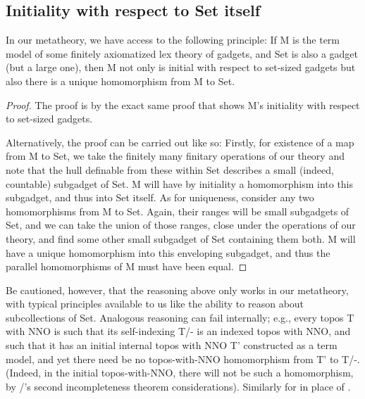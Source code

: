 \subsection{Initiality with respect to Set itself}
\begin{observation}\label{InitialWrtSet}
In our metatheory, we have access to the following principle: If M is the term model of some finitely axiomatized lex theory of gadgets, and Set is also a gadget (but a large one), then M not only is initial with respect to set-sized gadgets but also there is a unique homomorphism from M to Set.
\end{observation}
\begin{proof}
The proof is by the exact same proof that shows M's initiality with respect to set-sized gadgets.

Alternatively, the proof can be carried out like so: Firstly, for existence of a map from M to Set, we take the finitely many finitary operations of our theory and note that the hull definable from these within Set describes a small (indeed, countable) subgadget of Set. M will have by initiality a homomorphism into this subgadget, and thus into Set itself. As for uniqueness, consider any two homomorphisms from M to Set. Again, their ranges will be small subgadgets of Set, and we can take the union of those ranges, close under the operations of our theory, and find some other small subgadget of Set containing them both. M will have a unique homomorphism into this enveloping subgadget, and thus the parallel homomorphisms of M must have been equal.
\end{proof}

Be cautioned, however, that the reasoning above only works in our metatheory, with typical principles available to us like the ability to reason about subcollections of Set. Analogous reasoning can fail internally; e.g., every topos T with NNO is such that its self-indexing T/- is an indexed topos with NNO, and such that it has an initial internal topos with NNO T' constructed as a term model, and yet there need be no topos-with-NNO homomorphism from T' to T/-. (Indeed, in the initial topos-with-NNO, there will not be such a homomorphism, by \Goedel/'s second incompleteness theorem considerations). Similarly for  in place of .

